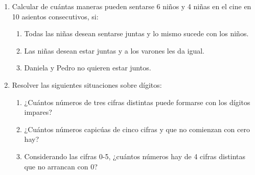 \documentclass[a4paper]{article}
\newcommand{\exercise}{\item}
\begin{document}
\begin{enumerate}
\begin{enumerate} [label=(\alph*)]
		\item En una fiesta se encuentran 18 personas. ¿De cuantas formas pueden integrarse en parejas para bailar una pieza?
		\item Para integrar una comisión, se deben elegir 4 personas entre un grupo formado por 8 hombres y 5 mujeres. ¿De cuántas formas puede hacerse?
		\item Para integrar una comisión, se deben elegir 4 personas entre un grupo formado por 8 hombres y 5 mujeres. ¿De cuántas formas puede hacerse si se establece la condición de que por lo menos 2 de los miembros deben ser mujeres?
		\item ¿Cuántos grupos de 6 hombres pueden formarse con 4 oficiales y 8 soldados de modo que: en cada grupo haya por lo menos un oficial?
		\item Si se consideran las distintas distribuciones de 15 bolillas en 8 casilleros numerados del 1 al 8, ¿en cuántas de dichas distribuciones el casillero 4 contiene exactamente 5 bolillas, si las bolillas son distintas?
		\item Si se consideran las distintas distribuciones de 15 bolillas en 8 casilleros numerados del 1 al 8, ¿en cuántas de dichas distribuciones el casillero 4 contiene exactamente 5 bolillas, si las bolillas son indistinguibles?
	\end{enumerate}
	\exercise Calcular de cuántas maneras pueden sentarse 6 niños y 4 niñas en el cine en 10 asientos consecutivos, si:
	\begin{enumerate} [label=(\alph*)]
		\item Todas las niñas desean sentarse juntas y lo mismo sucede con los niños.
		\item Las niñas desean estar juntas y a los varones les da igual.
		\item Daniela y Pedro no quieren estar juntos.
	\end{enumerate}
	\exercise Resolver las siguientes situaciones sobre dígitos:
	\begin{enumerate} [label=(\alph*)]
		\item ¿Cuántos números de tres cifras distintas puede formarse con los dígitos impares?
		\item ¿Cuántos números capicúas de cinco cifras y que no comienzan con cero hay?
		\item Considerando las cifras 0-5, ¿cuántos números hay de 4 cifras distintas que no arrancan con 0?

\end{enumerate}
\end{enumerate}
\end{document}
